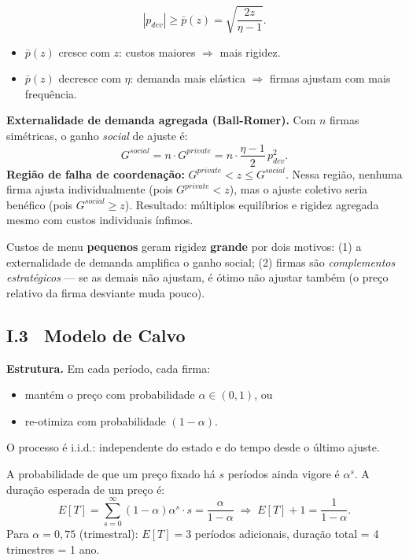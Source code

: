 \documentclass[12pt, a4paper]{article}
\begin{document}
\begin{resultbox}[title={Limiar de ajuste de preços}]
\[
\boxed{|p_{dev}| \geq \bar{p}(z) = \sqrt{\frac{2z}{\eta-1}}.}
\]
\begin{itemize}[leftmargin=1.5em, itemsep=2pt]
  \item $\bar{p}(z)$ cresce com $z$: custos maiores $\Rightarrow$ mais rigidez.
  \item $\bar{p}(z)$ decresce com $\eta$: demanda mais elástica $\Rightarrow$
        firmas ajustam com mais frequência.
\end{itemize}
\end{resultbox}

\textbf{Externalidade de demanda agregada (Ball-Romer).}
Com $n$ firmas simétricas, o ganho \emph{social} de ajuste é:
\[
G^{social} = n\cdot G^{private} = n\cdot\frac{\eta-1}{2}\,p_{dev}^2.
\]
\textbf{Região de falha de coordenação:} $G^{private} < z \leq G^{social}$.
Nessa região, nenhuma firma ajusta individualmente (pois $G^{private} < z$),
mas o ajuste coletivo seria benéfico (pois $G^{social} \geq z$).
Resultado: múltiplos equilíbrios e rigidez agregada mesmo com custos individuais ínfimos.

\begin{provabox}[title={Resultado central de Mankiw-Ball-Romer}]
Custos de menu \textbf{pequenos} geram rigidez \textbf{grande} por dois motivos:
(1) a externalidade de demanda amplifica o ganho social; (2) firmas são
\emph{complementos estratégicos} --- se as demais não ajustam, é ótimo não ajustar
também (o preço relativo da firma desviante muda pouco).
\end{provabox}

\subsection*{I.3 \ Modelo de Calvo}

\textbf{Estrutura.}
Em cada período, cada firma:
\begin{itemize}[leftmargin=1.5em, itemsep=2pt]
  \item mantém o preço com probabilidade $\alpha \in (0,1)$, ou
  \item re-otimiza com probabilidade $(1-\alpha)$.
\end{itemize}
O processo é i.i.d.: independente do estado e do tempo desde o último ajuste.

A probabilidade de que um preço fixado há $s$ períodos ainda vigore é $\alpha^s$.
A duração esperada de um preço é:
\[
E[T] = \sum_{s=0}^{\infty}(1-\alpha)\alpha^s \cdot s = \frac{\alpha}{1-\alpha}
\;\Rightarrow\; E[T]+1 = \frac{1}{1-\alpha}.
\]
Para $\alpha = 0{,}75$ (trimestral): $E[T] = 3$ períodos adicionais, duração total
= 4 trimestres = 1 ano.
\end{document}
